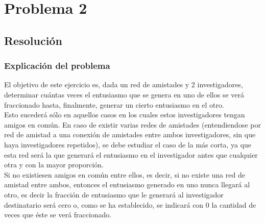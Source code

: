 \section{Problema 2}

\subsection{Resolución}

\subsubsection{Explicación del problema}
\indent El objetivo de este ejercicio es, dada un red de amistades y 2
investigadores, determinar cuántas veces el entusiasmo que se genera en uno de
ellos se verá fraccionado hasta, finalmente, generar un cierto entusiasmo en el
otro. \\
\indent Esto sucederá sólo en aquellos casos en los cuales estos investigadores
tengan amigos en común. En caso de existir varias redes de amistades
(entendiendose por red de amistad a una conexión de amistades entre ambos
investigadores, sin que haya investigadores repetidos), se debe estudiar el caso
de la más corta, ya que esta red será la que generará el entusiasmo en el
investigador antes que cualquier otra y con la mayor proporción. \\
\indent Si no existiesen amigos en común entre ellos, es decir, si no existe una
red de amistad entre ambos, entonces el entusiasmo generado en uno nunca llegará
al otro, es decir la fracción de entusiasmo que le generará al investigador
destinatario será cero o, como se ha establecido, se indicará con $0$ la
cantidad de veces que éste se verá fraccionado.

